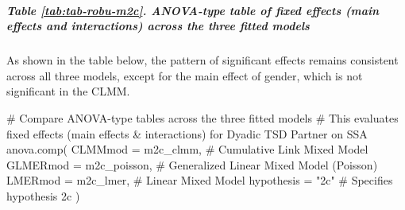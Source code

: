 \documentclass[
  bookmarksnumbered]{article}
\newenvironment{Shaded}{\begin{snugshade}}{\end{snugshade}}
\newcommand{\AttributeTok}[1]{\textcolor[rgb]{0.80,0.80,0.80}{#1}}
\newcommand{\CommentTok}[1]{\textcolor[rgb]{0.50,0.62,0.50}{#1}}
\newcommand{\FunctionTok}[1]{\textcolor[rgb]{0.94,0.94,0.56}{#1}}
\newcommand{\NormalTok}[1]{\textcolor[rgb]{0.80,0.80,0.80}{#1}}
\newcommand{\StringTok}[1]{\textcolor[rgb]{0.80,0.58,0.58}{#1}}
\begin{document}
\subparagraph{Table \ref{tab:tab-robu-m2c}. ANOVA-type table of fixed effects (main effects and interactions) across the three fitted models}\label{table-reftabtab-robu-m2c.-anova-type-table-of-fixed-effects-main-effects-and-interactions-across-the-three-fitted-models}

As shown in the table below, the pattern of significant effects remains consistent across all three models, except for the main effect of gender, which is not significant in the CLMM.

\begin{Shaded}
\begin{Highlighting}[]
\CommentTok{\# Compare ANOVA{-}type tables across the three fitted models}
\CommentTok{\# This evaluates fixed effects (main effects \& interactions) for Dyadic TSD Partner on SSA}
\FunctionTok{anova.comp}\NormalTok{(}
  \AttributeTok{CLMMmod =}\NormalTok{ m2c\_clmm, }\CommentTok{\# Cumulative Link Mixed Model}
  \AttributeTok{GLMERmod =}\NormalTok{ m2c\_poisson, }\CommentTok{\# Generalized Linear Mixed Model (Poisson)}
  \AttributeTok{LMERmod =}\NormalTok{ m2c\_lmer, }\CommentTok{\# Linear Mixed Model}
  \AttributeTok{hypothesis =} \StringTok{"2c"} \CommentTok{\# Specifies hypothesis 2c}
\NormalTok{)}
\end{Highlighting}
\end{Shaded}
\end{document}
